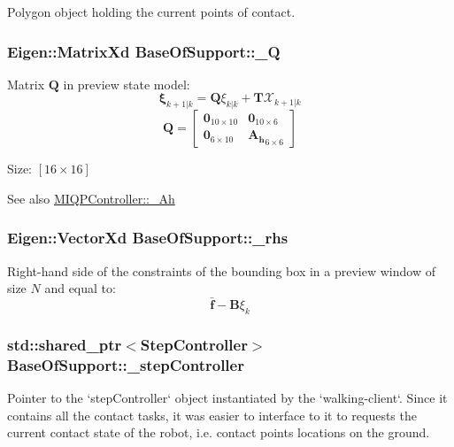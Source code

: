 \-Polygon object holding the current points of contact. \hypertarget{classBaseOfSupport_a22efc7f81862ffd1268b862ddb9d59ff}{
\subsubsection[{\-\_\-\-Q}]{\setlength{\rightskip}{0pt plus 5cm}\-Eigen\-::\-Matrix\-Xd {\bf \-Base\-Of\-Support\-::\-\_\-\-Q}}}\label{classBaseOfSupport_a22efc7f81862ffd1268b862ddb9d59ff}
\-Matrix $\mathbf{Q}$ in preview state model\-: \[ \mathbf{\xi}_{k+1|k} = \mathbf{Q} \xi_{k|k} + \mathbf{T}\mathcal{X}_{k+1|k} \] \[ \mathbf{Q} = \left[\begin{array}{cc} \mathbf{0}_{10\times10} & \mathbf{0}_{10\times6}\\ \mathbf{0}_{6\times10} & \mathbf{A_h}_{6\times6} \end{array}\right] \]

\-Size\-: $[16\times16]$

\begin{DoxySeeAlso}{\-See also}
\hyperlink{classMIQPController_a388ed1c232c212e171276993b5cb3fec}{\-M\-I\-Q\-P\-Controller\-::\-\_\-\-Ah} 
\end{DoxySeeAlso}
\hypertarget{classBaseOfSupport_a274325bb39f10aac06153b82a2541c3b}{
\subsubsection[{\-\_\-rhs}]{\setlength{\rightskip}{0pt plus 5cm}\-Eigen\-::\-Vector\-Xd {\bf \-Base\-Of\-Support\-::\-\_\-rhs}}}\label{classBaseOfSupport_a274325bb39f10aac06153b82a2541c3b}
\-Right-\/hand side of the constraints of the bounding box in a preview window of size $N$ and equal to\-: \[ \bar{\mathbf{f}} - \mathbf{B}\xi_k \] \hypertarget{classBaseOfSupport_a023d28c6900f0e97d9de42ca2c5d94a5}{
\subsubsection[{\-\_\-step\-Controller}]{\setlength{\rightskip}{0pt plus 5cm}std\-::shared\-\_\-ptr$<${\bf \-Step\-Controller}$>$ {\bf \-Base\-Of\-Support\-::\-\_\-step\-Controller}}}\label{classBaseOfSupport_a023d28c6900f0e97d9de42ca2c5d94a5}
\-Pointer to the `step\-Controller` object instantiated by the `walking-\/client`. \-Since it contains all the contact tasks, it was easier to interface to it to requests the current contact state of the robot, i.\-e. contact points locations on the ground.

